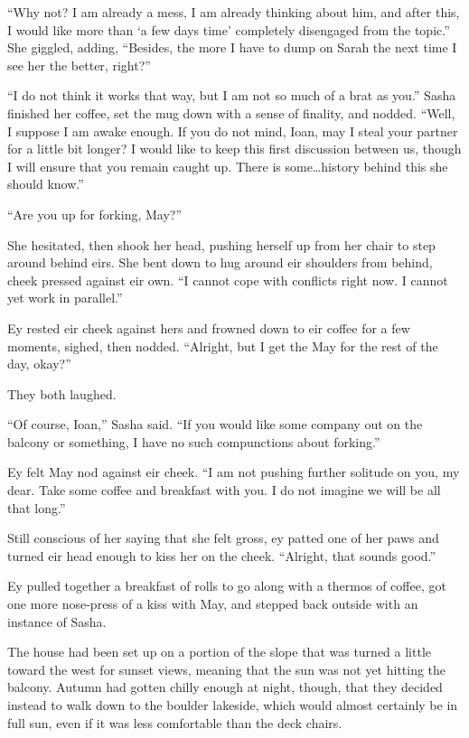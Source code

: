 ``Why not? I am already a mess, I am already thinking about him, and after this, I would like more than `a few days time' completely disengaged from the topic.'' She giggled, adding, ``Besides, the more I have to dump on Sarah the next time I see her the better, right?''

``I do not think it works that way, but I am not so much of a brat as you.'' Sasha finished her coffee, set the mug down with a sense of finality, and nodded. ``Well, I suppose I am awake enough. If you do not mind, Ioan, may I steal your partner for a little bit longer? I would like to keep this first discussion between us, though I will ensure that you remain caught up. There is some\ldots history behind this she should know.''

``Are you up for forking, May?''

She hesitated, then shook her head, pushing herself up from her chair to step around behind eirs. She bent down to hug around eir shoulders from behind, cheek pressed against eir own. ``I cannot cope with conflicts right now. I cannot yet work in parallel.''

Ey rested eir cheek against hers and frowned down to eir coffee for a few moments, sighed, then nodded. ``Alright, but I get the May for the rest of the day, okay?''

They both laughed.

``Of course, Ioan,'' Sasha said. ``If you would like some company out on the balcony or something, I have no such compunctions about forking.''

Ey felt May nod against eir cheek. ``I am not pushing further solitude on you, my dear. Take some coffee and breakfast with you. I do not imagine we will be all that long.''

Still conscious of her saying that she felt gross, ey patted one of her paws and turned eir head enough to kiss her on the cheek. ``Alright, that sounds good.''

Ey pulled together a breakfast of rolls to go along with a thermos of coffee, got one more nose-press of a kiss with May, and stepped back outside with an instance of Sasha.

The house had been set up on a portion of the slope that was turned a little toward the west for sunset views, meaning that the sun was not yet hitting the balcony. Autumn had gotten chilly enough at night, though, that they decided instead to walk down to the boulder lakeside, which would almost certainly be in full sun, even if it was less comfortable than the deck chairs.

